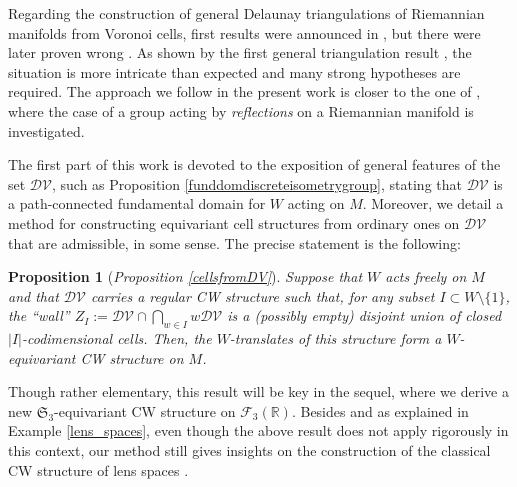 \documentclass[11pt,twoside]{amsart}
\theoremstyle{plain}
\newtheorem*{prop*}{Proposition}
\newcommand{\R}{{\mathbb R}}
\newcommand{\Sym}{\mathfrak{S}}
\begin{document}
Regarding the construction of general Delaunay triangulations of Riemannian manifolds from Voronoi cells, first results were announced in \cite{leibon-letscher}, but there were later proven wrong \cite{boissonnat-dyer-ghosh_rep, boissonnat-dyer-ghosh-martynchuk}. As shown by the first general triangulation result \cite{boissonnat-dyer-ghosh17}, the situation is more intricate than expected and many strong hypotheses are required. The approach we follow in the present work is closer to the one of \cite{reflection_groups_on_manifolds}, where the case of a group acting by {\it reflections} on a Riemannian manifold is investigated.

The first part of this work is devoted to the exposition of general features of the set $\mathcal{DV}$, such as Proposition \ref{funddomdiscreteisometrygroup}, stating that $\mathcal{DV}$ is a path-connected fundamental domain for $W$ acting on $M$. Moreover, we detail a method for constructing equivariant cell structures from ordinary ones on $\mathcal{DV}$ that are admissible, in some sense. The precise statement is the following:
\begin{prop*}[\emph{Proposition \ref{cellsfromDV}}]
Suppose that $W$ acts freely on $M$ and that $\mathcal{DV}$ carries a regular CW structure such that, for any subset $I\subset W\setminus\{1\}$, the ``wall'' $Z_I:=\mathcal{DV}\cap\bigcap_{w\in I}w\mathcal{DV}$ is a (possibly empty) disjoint union of closed $|I|$-codimensional cells. Then, the $W$-translates of this structure form a $W$-equivariant CW structure on $M$.
\end{prop*}

Though rather elementary, this result will be key in the sequel, where we derive a new $\Sym_3$-equivariant CW structure on $\mathcal{F}_3(\R)$. Besides and as explained in Example \ref{lens_spaces}, even though the above result does not apply rigorously in this context, our method still gives insights on the construction of the classical CW structure of lens spaces \cite{hatcher}.
\end{document}
